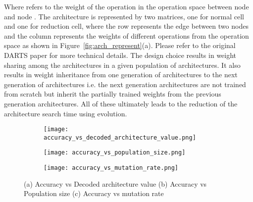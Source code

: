 \documentclass[final]{cvpr}
\begin{document}
Where  refers to the weight of the operation  in the
operation space  between node  and node . The architecture is represented by two 
matrices, one for normal cell and one for reduction cell, where the row represents the edge
between two nodes and the column represents the weights of different operations from the
operation space as shown in Figure~\ref{fig:arch_represent}(a). Please refer to the original
DARTS paper \cite{liu2018darts2} for more technical details.
The design choice results in weight sharing among the architectures in a given population of
architectures. It also results in weight inheritance from one generation of 
architectures to the next generation of architectures i.e. the next generation
architectures are not trained from scratch but inherit the partially trained weights
from the previous generation architectures. All of these ultimately
leads to the reduction of the architecture search time using evolution.

\begin{figure*}[t]
  \centering
\begin{subfigure}{0.3\linewidth}
\texttt{[image: accuracy\_vs\_decoded\_architecture\_value.png]}
    \caption{}
    \label{subfig:AccVsArch}
  \end{subfigure}
  \quad
  \begin{subfigure}{0.3\linewidth}
\texttt{[image: accuracy\_vs\_population\_size.png]}
    \caption{}
    \label{subfig:AccVsPop}
  \end{subfigure}
  \quad
  \begin{subfigure}{0.3\linewidth}
\texttt{[image: accuracy\_vs\_mutation\_rate.png]}
    \caption{}
    \label{subfig:AccVsMrate}
  \end{subfigure}
  
  \caption{(a) Accuracy vs Decoded architecture value
           (b) Accuracy vs Population size
           (c) Accuracy vs mutation rate}
  \label{fig:exp}
  \end{figure*}
\end{document}
